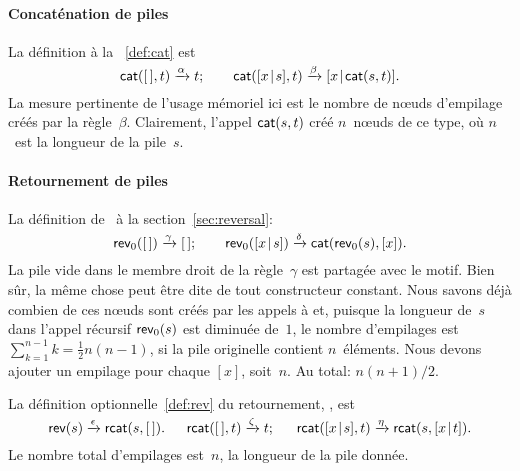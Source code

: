 \paragraph{Concaténation de piles}

La définition à la \fig~\vref{def:cat} est
\begin{equation*}
\textsf{cat}(        [\,],t) \xrightarrow{\smash{\alpha}} t;\qquad
\textsf{cat}([{x}\!\mid\!{s}],t) \xrightarrow{\smash{\beta}}
                                 [{x}\!\mid\!{\textsf{cat}(s,t)}].
\end{equation*}
La mesure pertinente de l'usage mémoriel ici est le nombre de
n{\oe}uds d'empilage créés par la
règle~\(\beta\). Clairement, l'appel \(\textsf{cat}(s,t)\) créé
\(n\)~n{\oe}uds de ce type, où \(n\)~est la longueur de la pile~\(s\).


\paragraph{Retournement de piles}

La définition de~ à la section~\ref{sec:reversal}:
\begin{equation*}
\textsf{rev}_0([\,]) \xrightarrow{\smash{\gamma}} [\,];\qquad
\textsf{rev}_0([{x}\!\mid\!{s}]) \xrightarrow{\smash{\delta}}
                         \textsf{cat}(\textsf{rev}_0(s),[x]).
\end{equation*}
La pile vide dans le membre droit de la règle~\(\gamma\) est partagée
avec le motif. Bien sûr, la même chose peut être dite de tout
constructeur constant. Nous savons déjà combien de ces n{\oe}uds sont
créés par les appels à  et, puisque la longueur de~\(s\)
dans l'appel récursif \(\textsf{rev}_0(s)\) est diminuée de~\(1\), le
nombre d'empilages est \(\sum_{k=1}^{n-1}k = \tfrac{1}{2}n(n-1)\), si
la pile originelle contient \(n\)~éléments. Nous devons ajouter un
empilage pour chaque \([x]\), soit~\(n\). Au total: \(n(n+1)/2\).

La définition optionnelle~\eqref{def:rev} du retournement,
, est
\begin{equation*}
\textsf{rev}(s) \xrightarrow{\smash{\epsilon}} \textsf{rcat}(s,[\,]).\quad\;\;
\textsf{rcat}([\,],t) \xrightarrow{\smash{\zeta}} t;\quad\;\;
\textsf{rcat}([{x}\!\mid\!{s}],t) \xrightarrow{\smash{\eta}}
                          \textsf{rcat}(s,[{x}\!\mid\!{t}]).
\end{equation*}
Le nombre total d'empilages est~\(n\), la longueur de la pile donnée.

